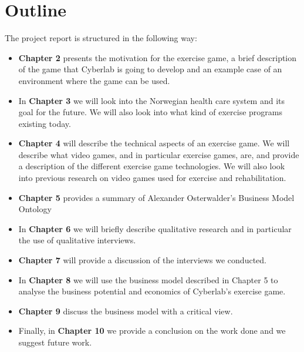 \section{Outline}
The project report is structured in the following way:
\begin{itemize}
\renewcommand{\labelitemi}{$\bullet$}
\item \textbf{Chapter 2} presents the motivation for the exercise game, a brief description of the game that Cyberlab is going to develop and an example case of an environment where the game can be used.
\item In \textbf{Chapter 3} we will look into the Norwegian health care system and its goal for the future. We will also look into what kind of exercise programs existing today.
\item	\textbf{Chapter 4} will describe the technical aspects of an exercise game. We will describe what video games, and in particular exercise games, are, and provide a description of the different exercise game technologies. We will also look into previous research on video games used for exercise and rehabilitation.
\item	\textbf{Chapter 5} provides a summary of Alexander Osterwalder's Business Model Ontology
\item	In \textbf{Chapter 6} we will briefly describe qualitative research and in particular the use of qualitative interviews. 
\item	\textbf{Chapter 7} will provide a discussion of the interviews we conducted.
\item In \textbf{Chapter 8} we will use the business model described in Chapter 5 to analyse the business potential and economics of Cyberlab's exercise game.
\item  \textbf{Chapter 9} discuss the business model with a critical view.
\item Finally, in \textbf{Chapter 10} we provide a conclusion on the work done and we suggest future work.
\end{itemize}